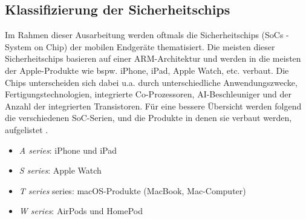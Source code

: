\subsection{Klassifizierung der Sicherheitschips}
Im Rahmen dieser Ausarbeitung werden oftmals die Sicherheitschips (SoCs - System on Chip) der mobilen Endgeräte thematisiert. 
Die meisten dieser Sicherheitschips basieren auf einer ARM-Architektur und werden in die meisten der Apple-Produkte wie bspw.
iPhone, iPad, Apple Watch, etc. verbaut. Die Chips unterscheiden sich dabei u.a. durch unterschiedliche Anwendungszwecke, 
Fertigungstechnologien, integrierte Co-Prozessoren, AI-Beschleuniger und der Anzahl der integrierten Transistoren. Für eine 
bessere Übersicht werden folgend die verschiedenen SoC-Serien, und die Produkte
in denen sie verbaut werden, aufgelistet \cite{apple2020}.

\begin{itemize}
\item \textit{A series}: iPhone und iPad
\item \textit{S series}: Apple Watch
\item \textit{T series} series: macOS-Produkte (MacBook, Mac-Computer)
\item \textit{W series}: AirPods und HomePod
\end{itemize}




